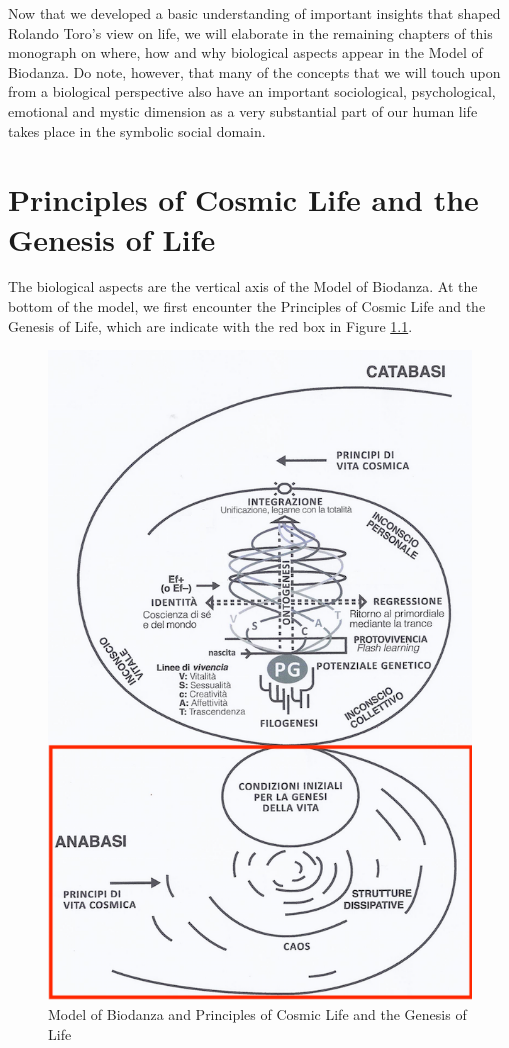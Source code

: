 \documentclass[
  11pt,
]{book}
\begin{document}
Now that we developed a basic understanding of important insights that shaped Rolando Toro's view on life, we will elaborate in the remaining chapters of this monograph on where, how and why biological aspects appear in the Model of Biodanza. Do note, however, that many of the concepts that we will touch upon from a biological perspective also have an important sociological, psychological, emotional and mystic dimension as a very substantial part of our human life takes place in the symbolic social domain.

\hypertarget{principles-of-cosmic-life-and-the-genesis-of-life}{%
\chapter{Principles of Cosmic Life and the Genesis of Life}\label{principles-of-cosmic-life-and-the-genesis-of-life}}

The biological aspects are the vertical axis of the Model of Biodanza.
At the bottom of the model, we first encounter the Principles of Cosmic Life and the Genesis of Life, which are indicate with the red box in Figure \ref{fig:modelCosmic}.

\begin{figure}

{\centering \includegraphics[width=0.5\linewidth]{./figs/biologischeAspectenBiodanzaDeelI} 

}

\caption{Model of Biodanza and Principles of Cosmic Life and the Genesis of Life}\label{fig:modelCosmic}
\end{figure}
\end{document}

